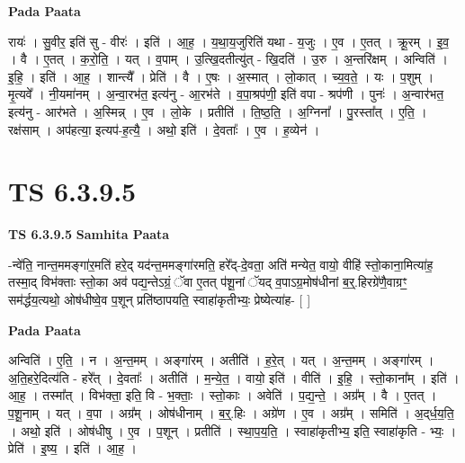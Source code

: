 \documentclass[17pt]{extarticle}
\begin{document}
\textbf{Pada Paata} \newline

रायः॑ । सु॒वीर॒ इति॑ सु - वीरः॑ । इति॑ । आ॒ह॒ । य॒था॒य॒जुरिति॑ यथा - य॒जुः । ए॒व । ए॒तत् । क्रू॒रम् । इ॒व॒ । वै । ए॒तत् । क॒रो॒ति॒ । यत् । व॒पाम् । उ॒त्खि॒दतीत्यु॑त् - खि॒दति॑ । उ॒रु । अ॒न्तरि॑क्षम् । अन्विति॑ । इ॒हि॒ । इति॑ । आ॒ह॒ । शान्त्यै᳚ । प्रेति॑ । वै । ए॒षः । अ॒स्मात् । लो॒कात् । च्य॒व॒ते॒ । यः । प॒शुम् । मृ॒त्यवे᳚ । नी॒यमा॑नम् । अ॒न्वा॒रभ॑त॒ इत्य॑नु - आ॒रभ॑ते । व॒पा॒श्रप॑णी॒ इति॑ वपा - श्रप॑णी । पुनः॑ । अ॒न्वार॑भत॒ इत्य॑नु - आर॑भते । अ॒स्मिन्न् । ए॒व । लो॒के । प्रतीति॑ । ति॒ष्ठ॒ति॒ । अ॒ग्निना᳚ । पु॒रस्ता᳚त् । ए॒ति॒ । रक्ष॑साम् । अप॑हत्या॒ इत्यप॑-ह॒त्यै॒ । अथो॒ इति॑ । दे॒वताः᳚ । ए॒व । ह॒व्येन॑ ।  \newline





\section{ TS 6.3.9.5 }

\textbf{TS 6.3.9.5 } \newline
\textbf{Samhita Paata} \newline

-न्वे॑ति॒ नान्त॒ममङ्गा॑र॒मति॑ हरे॒द् यद॑न्त॒ममङ्गा॑रमति॒ हरे᳚द्-दे॒वता॒ अति॑ मन्येत॒ वायो॒ वीहि॑ स्तो॒काना॒मित्या॑ह॒ तस्मा॒द् विभ॑क्ताः स्तो॒का अव॑ पद्य॒न्तेऽग्रं॒ ॅवा ए॒तत् प॑शू॒नां ॅयद् व॒पाऽग्र॒मोष॑धीनां ब॒र्॒.हिरग्रे॑णै॒वाग्रꣳ॒॒ सम॑र्द्धय॒त्यथो॒ ओष॑धीष्वे॒व प॒शून् प्रति॑ष्ठापयति॒ स्वाहा॑कृतीभ्यः॒ प्रेष्येत्या॑ह- [  ] \newline

\textbf{Pada Paata} \newline

अन्विति॑ । ए॒ति॒ । न । अ॒न्त॒मम् । अङ्गा॑रम् । अतीति॑ । ह॒रे॒त् । यत् । अ॒न्त॒मम् । अङ्गा॑रम् । अ॒ति॒हरे॒दित्य॑ति - हरे᳚त् । दे॒वताः᳚ । अतीति॑ । म॒न्ये॒त॒ । वायो॒ इति॑ । वीति॑ । इ॒हि॒ । स्तो॒काना᳚म् । इति॑ । आ॒ह॒ । तस्मा᳚त् । विभ॑क्ता॒ इति॒ वि - भ॒क्ताः॒ । स्तो॒काः । अवेति॑ । प॒द्य॒न्ते॒ । अग्र᳚म् । वै । ए॒तत् । प॒शू॒नाम् । यत् । व॒पा । अग्र᳚म् । ओष॑धीनाम् । ब॒र्॒.हिः । अग्रे॑ण । ए॒व । अग्र᳚म् । समिति॑ । अ॒द्‌र्ध॒य॒ति॒ । अथो॒ इति॑ । ओष॑धीषु । ए॒व । प॒शून् । प्रतीति॑ । स्था॒प॒य॒ति॒ । स्वाहा॑कृतीभ्य॒ इति॒ स्वाहा॑कृति - भ्यः॒ । प्रेति॑ । इ॒ष्य॒ । इति॑ । आ॒ह॒ ।  \newline




\end{document}
